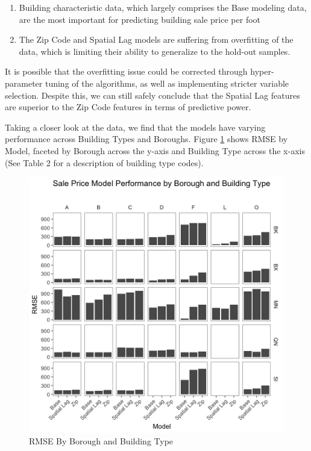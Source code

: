 \documentclass[]{article}
\providecommand{\tightlist}{%
  \setlength{\itemsep}{0pt}\setlength{\parskip}{0pt}}
\begin{document}
\begin{enumerate}
\def\labelenumi{\arabic{enumi})}
\tightlist
\item
  Building characteristic data, which largely comprises the Base
  modeling data, are the most important for predicting building sale
  price per foot
\item
  The Zip Code and Spatial Lag models are suffering from overfitting of
  the data, which is limiting their ability to generalize to the
  hold-out samples.
\end{enumerate}

It is possible that the overfitting issue could be corrected through
hyper-parameter tuning of the algorithms, as well as implementing
stricter variable selection. Despite this, we can still safely conclude
that the Spatial Lag features are superior to the Zip Code features in
terms of predictive power.

Taking a closer look at the data, we find that the models have varying
performance across Building Types and Boroughs. Figure
\ref{fig:RMSE by boro and build type} shows RMSE by Model, faceted by
Borough across the y-axis and Building Type across the x-axis (See Table
2 for a description of building type codes).

\begin{figure}
\includegraphics[width=1\linewidth]{Sections/tables and figures/RMSE by boro and build type} \caption{RMSE By Borough and Building Type}\label{fig:RMSE by boro and build type}
\end{figure}
\end{document}

